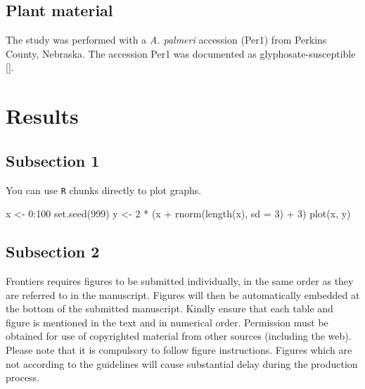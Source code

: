 \documentclass[utf8]{frontiersSCNS}
\newenvironment{Shaded}{\begin{snugshade}}{\end{snugshade}}
\newcommand{\AttributeTok}[1]{\textcolor[rgb]{0.77,0.63,0.00}{#1}}
\newcommand{\DecValTok}[1]{\textcolor[rgb]{0.00,0.00,0.81}{#1}}
\newcommand{\FunctionTok}[1]{\textcolor[rgb]{0.00,0.00,0.00}{#1}}
\newcommand{\NormalTok}[1]{#1}
\newcommand{\OtherTok}[1]{\textcolor[rgb]{0.56,0.35,0.01}{#1}}
\newcommand{\SpecialCharTok}[1]{\textcolor[rgb]{0.00,0.00,0.00}{#1}}
\begin{document}
\hypertarget{plant-material}{%
\subsection*{Plant material}\label{plant-material}}

The study was performed with a \emph{A. palmeri} accession (Per1) from
Perkins County, Nebraska. The accession Per1 was documented as
glyphosate-susceptible {[}{]}.

\hypertarget{results}{%
\section*{Results}\label{results}}

\hypertarget{subsection-1}{%
\subsection*{Subsection 1}\label{subsection-1}}

You can use \texttt{R} chunks directly to plot graphs.

\begin{Shaded}
\begin{Highlighting}[]
\NormalTok{x }\OtherTok{\textless{}{-}} \DecValTok{0}\SpecialCharTok{:}\DecValTok{100}
\FunctionTok{set.seed}\NormalTok{(}\DecValTok{999}\NormalTok{)}
\NormalTok{y }\OtherTok{\textless{}{-}} \DecValTok{2} \SpecialCharTok{*}\NormalTok{ (x }\SpecialCharTok{+} \FunctionTok{rnorm}\NormalTok{(}\FunctionTok{length}\NormalTok{(x), }\AttributeTok{sd =} \DecValTok{3}\NormalTok{) }\SpecialCharTok{+} \DecValTok{3}\NormalTok{)}
\FunctionTok{plot}\NormalTok{(x, y)}
\end{Highlighting}
\end{Shaded}

\hypertarget{subsection-2}{%
\subsection*{Subsection 2}\label{subsection-2}}

Frontiers requires figures to be submitted individually, in the same
order as they are referred to in the manuscript. Figures will then be
automatically embedded at the bottom of the submitted manuscript. Kindly
ensure that each table and figure is mentioned in the text and in
numerical order. Permission must be obtained for use of copyrighted
material from other sources (including the web). Please note that it is
compulsory to follow figure instructions. Figures which are not
according to the guidelines will cause substantial delay during the
production process.
\end{document}
